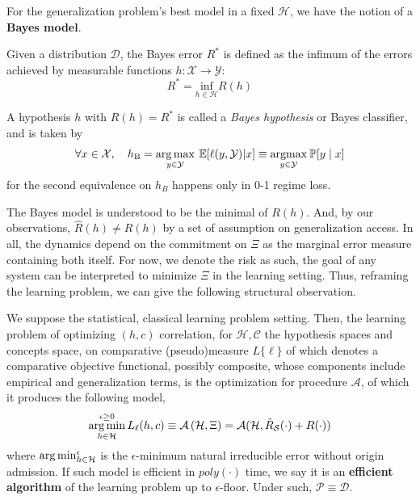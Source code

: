 For the generalization problem's best model in a fixed $\mathcal{H}$, we have the notion of a \textbf{Bayes model}.
\begin{definition}
    Given a distribution $\mathcal{D}$, the Bayes error $R^{*}$ is defined as the infimum of the errors achieved by measurable functions $h:\mathcal{X}\to \mathcal{Y}$: 
    \begin{equation}
        R^{*}=\underset{h\in \mathcal{H}}{\mathrm{inf}}R(h)
    \end{equation}
\end{definition}
\begin{definition}
    A hypothesis $h$ with $R(h)=R^{*}$ is called a \textit{Bayes hypothesis} or Bayes classifier, and is taken by \begin{equation}
        \forall x\in \mathcal{X}, \quad h_{\mathrm{B}}=\operatorname*{arg\,max}_{y\in\mathcal{Y}} \: \mathbb{E}[\ell(y,\mathcal{Y})|x] \equiv \underset{y\in \mathcal{Y}}{\mathrm{argmax}}\:\mathbb{P}[y\mid x]
    \end{equation}
    for the second equivalence on $h_{B}$ happens only in 0-1 regime loss.  
\end{definition}

The Bayes model is understood to be the minimal of $R(h)$. And, by our observations, $\hat{R}(h)\neq R(h)$ by a set of assumption on generalization access. In all, the dynamics depend on the commitment on $\Xi$ as the marginal error measure containing both itself. For now, we denote the risk as such, the goal of any system can be interpreted to minimize $\Xi$ in the learning setting. Thus, reframing the learning problem, we can give the following structural observation. 

\begin{theorem}
    We suppose the statistical, classical learning problem setting. Then, the learning problem of optimizing $(h,c)$ correlation, for $\mathcal{H},\mathcal{C}$ the hypothesis spaces and concepts space, on comparative (pseudo)measure $L\{\ell\}$ of which denotes a comparative objective functional, possibly composite, whose components include empirical and generalization terms, is the optimization for procedure $\mathcal{A}$, of which it produces the following model,
    \begin{equation}
        \operatorname*{arg\,min}_{h\in\mathcal{H}}^{\epsilon\geq 0} L_{\ell}(h,c) \equiv \mathcal{A}\left(\mathcal{H},\Xi\right) = \mathcal{A}(\mathcal{H}, \hat{R}_{\mathcal{S}}(\cdot)+R(\cdot))
    \end{equation}
    where $\operatorname*{arg\,min}_{h\in\mathcal{H}}^{\epsilon}$ is the $\epsilon$-minimum natural irreducible error without origin admission. If such model is efficient in $poly(\cdot)$ time, we say it is an \textbf{efficient algorithm} of the learning problem up to $\epsilon$-floor. Under such, $\mathcal{P}\equiv \mathcal{D}$. 
\end{theorem}

